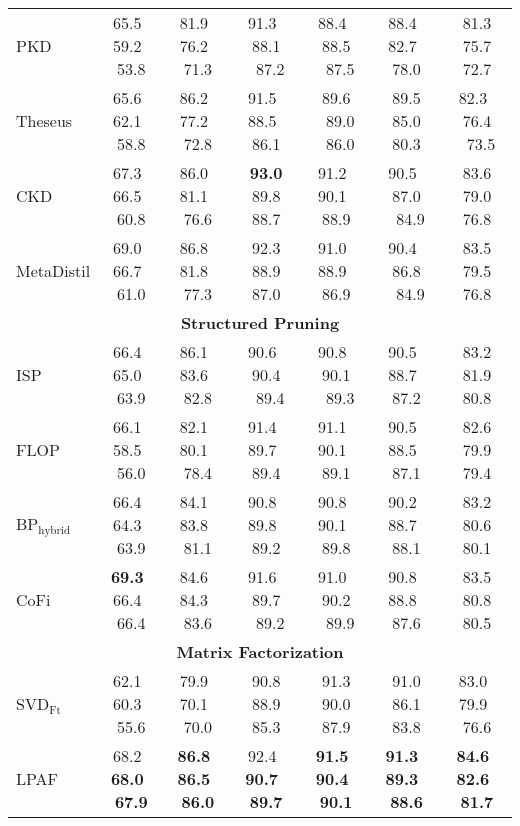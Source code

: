 \begin{table*}[t]
\begin{tabular}{l|cccccc}
		PKD  &65.5~ 59.2~ 53.8 &81.9~ 76.2~ 71.3    & 91.3~ 88.1 ~87.2          & 88.4~ 88.5 ~87.5          & 88.4~ 82.7~ 78.0          & 81.3 ~75.7~ 72.7                                                  \\
		Theseus &65.6~ 62.1~ 58.8 &86.2~ 77.2~ 72.8   & 91.5~ 88.5~ 86.1          & 89.6 ~89.0 ~86.0          & 89.5 ~85.0~ 80.3          & 82.3~ 76.4 ~73.5                                         \\
		CKD   &67.3~ 66.5~ 60.8 &86.0~ 81.1~ 76.6   & \textbf{93.0} ~89.8~ 88.7          & 91.2~ 90.1~ 88.9          & 90.5~ 87.0 ~84.9          & 83.6 ~79.0~ 76.8                                \\
		MetaDistil  &69.0~ 66.7~ 61.0 &86.8~ 81.8~ 77.3    & 92.3 ~88.9~ 87.0          & 91.0~ 88.9~ 86.9          & 90.4~ 86.8 ~84.9          & 83.5 ~79.5~ 76.8                             \\
		\midrule
		\multicolumn{7}{c}{\textbf{Structured Pruning}}   \\
		\midrule
		ISP  &66.4~ 65.0~ 63.9 &86.1~ 83.6~ 82.8   & 90.6~ 90.4 ~89.4          & 90.8~ 90.1 ~89.3          & 90.5~ 88.7~ 87.2          & 83.2 ~81.9~ 80.8                                                  \\
		FLOP &66.1~ 58.5~ 56.0 &82.1~ 80.1~ 78.4   & 91.4~ 89.7~ 89.4          & 91.1~ 90.1~ 89.1          & 90.5~ 88.5~ 87.1          & 82.6 ~79.9~ 79.4                                                  \\
		BP$_{\text{hybrid}}$ &66.4~ 64.3~ 63.9&84.1~ 83.8~ 81.1   & 90.8~ 89.8~ 89.2          & 90.8~ 90.1~ 89.8          & 90.2~ 88.7~ 88.1          & 83.2 ~80.6~ 80.1                                                  \\
		CoFi  &\textbf{69.3}~ 66.4~ 66.4 &84.6~ 84.3~ 83.6   & 91.6~ 89.7 ~89.2          & 91.0~ 90.2 ~89.9          & 90.8~ 88.8~ 87.6          & 83.5 ~80.8~ 80.5                                                  \\
		\midrule
		\multicolumn{7}{c}{\textbf{Matrix Factorization}}   \\
	\midrule
		SVD$_{\text{Ft}}$  &62.1~ 60.3~ 55.6 &79.9~ 70.1~ 70.0  & 90.8 ~88.9~ 85.3         & 91.3 ~90.0~ 87.9          & 91.0 ~86.1~ 83.8          & 83.0~ 79.9~ 76.6         \\
		LPAF  &68.2~ \textbf{68.0}~ \textbf{67.9} &\textbf{86.8}~ \textbf{86.5}~ \textbf{86.0}  & 92.4~ \textbf{90.7~ 89.7} & \textbf{91.5}~ \textbf{90.4}~ \textbf{90.1} & \textbf{91.3~ 89.3~ 88.6} & \textbf{84.6}~ \textbf{82.6}~ \textbf{81.7}  \\

\end{tabular}
\end{table*}
